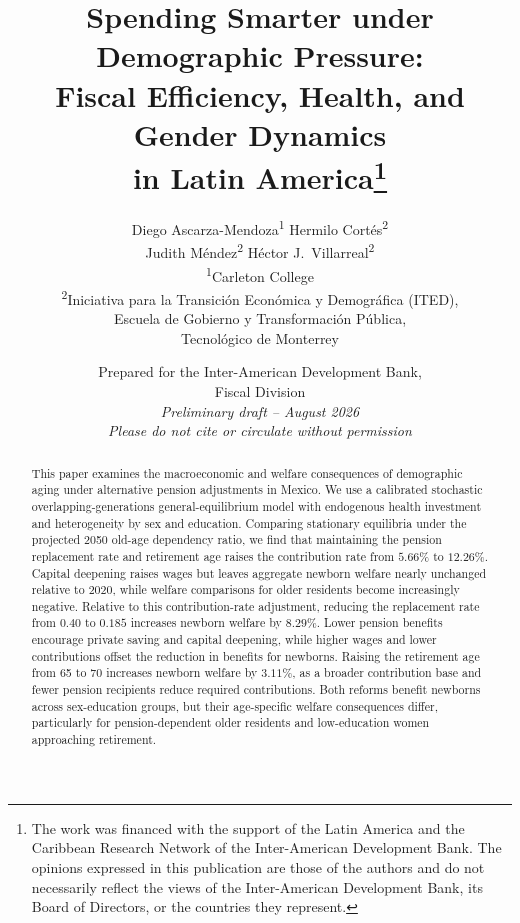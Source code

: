 \documentclass[12pt,a4paper]{article}
\begin{document}
\title{\textbf{Spending Smarter under Demographic Pressure:}\\[6pt]
Fiscal Efficiency, Health, and Gender Dynamics\\
in Latin America\thanks{The work was financed with the support of the Latin America and the Caribbean Research Network of the Inter-American Development Bank. The opinions expressed in this publication are those of the authors and do not necessarily reflect the views of the Inter-American Development Bank, its Board of Directors, or the countries they represent.}}

\author{
Diego Ascarza-Mendoza\textsuperscript{1} \quad Hermilo Cort\'es\textsuperscript{2}\\[3pt]
Judith M\'endez\textsuperscript{2} \quad H\'ector J.\ Villarreal\textsuperscript{2}
\\[6pt]
\textsuperscript{1}Carleton College\\
\textsuperscript{2}Iniciativa para la Transici\'on Econ\'omica y Demogr\'afica (ITED),\\
Escuela de Gobierno y Transformaci\'on P\'ublica,\\
Tecnol\'ogico de Monterrey
}
\date{%
Prepared for the Inter-American Development Bank,\\
Fiscal Division\\[12pt]
\textit{Preliminary draft -- August 2026}\\
\textit{Please do not cite or circulate without permission}
}

\maketitle



\begin{abstract}
This paper examines the macroeconomic and welfare consequences of demographic aging under alternative pension adjustments in Mexico. We use a calibrated stochastic overlapping-generations general-equilibrium model with endogenous health investment and heterogeneity by sex and education. Comparing stationary equilibria under the projected 2050 old-age dependency ratio, we find that maintaining the pension replacement rate and retirement age raises the contribution rate from $5.66\%$ to $12.26\%$. Capital deepening raises wages but leaves aggregate newborn welfare nearly unchanged relative to 2020, while welfare comparisons for older residents become increasingly negative. Relative to this contribution-rate adjustment, reducing the replacement rate from $0.40$ to $0.185$ increases newborn welfare by $8.29\%$. Lower pension benefits encourage private saving and capital deepening, while higher wages and lower contributions offset the reduction in benefits for newborns. Raising the retirement age from 65 to 70 increases newborn welfare by $3.11\%$, as a broader contribution base and fewer pension recipients reduce required contributions. Both reforms benefit newborns across sex-education groups, but their age-specific welfare consequences differ, particularly for pension-dependent older residents and low-education women approaching retirement. 
\end{abstract}
\end{document}
